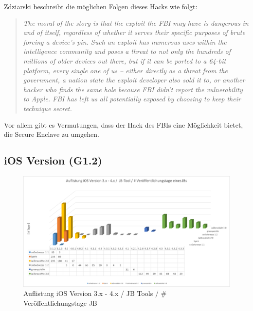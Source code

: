 Zdziarski beschreibt die möglichen Folgen dieses Hacks wie folgt: 
\begin{quote}
    \textit{\glqq The moral of the story is that the exploit the FBI may have is dangerous in and of itself, regardless of whether it serves their specific purposes of brute forcing a device’s pin. Such an exploit has numerous uses within the intelligence community and poses a threat to not only the hundreds of millions of older devices out there, but if it can be ported to a 64-bit platform, every single one of us – either directly as a threat from the government, a nation state the exploit developer also sold it to, or another hacker who finds the same hole because FBI didn’t report the vulnerability to Apple. FBI has left us all potentially exposed by choosing to keep their technique secret.\grqq{}} \cite{Hacking[4]} \par 
\end{quote}
Vor allem gibt es Vermutungen, dass der Hack des FBIs eine Möglichkeit bietet, die Secure Enclave zu umgehen.


\newpage
\subsection{iOS Version  (G1.2)}
\label{sec:Frage1iOSVersion} 

\begin{figure}[hp!]
        \centering
                \includegraphics[scale=0.45]{Bilder/Frage1_1.png}
        \caption{Auflistung iOS Version 3.x - 4.x / JB Tools / \newline \# Veröffentlichungstage JB \protect\footnotemark}
        \label{fig:AnalyseiOSJB1}        
\end{figure}

